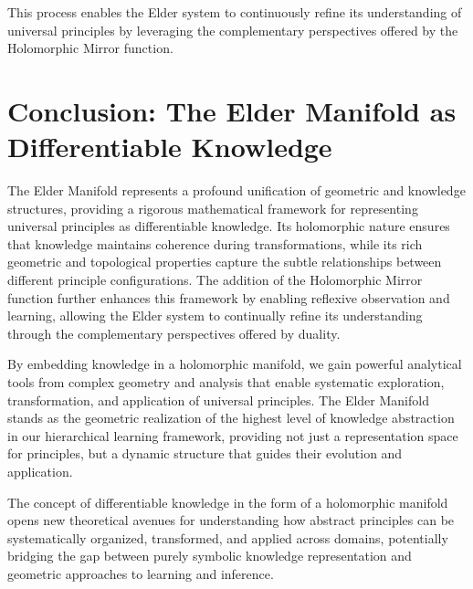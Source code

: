 This process enables the Elder system to continuously refine its understanding of universal principles by leveraging the complementary perspectives offered by the Holomorphic Mirror function.

\section{Conclusion: The Elder Manifold as Differentiable Knowledge}

The Elder Manifold represents a profound unification of geometric and knowledge structures, providing a rigorous mathematical framework for representing universal principles as differentiable knowledge. Its holomorphic nature ensures that knowledge maintains coherence during transformations, while its rich geometric and topological properties capture the subtle relationships between different principle configurations. The addition of the Holomorphic Mirror function further enhances this framework by enabling reflexive observation and learning, allowing the Elder system to continually refine its understanding through the complementary perspectives offered by duality.

By embedding knowledge in a holomorphic manifold, we gain powerful analytical tools from complex geometry and analysis that enable systematic exploration, transformation, and application of universal principles. The Elder Manifold stands as the geometric realization of the highest level of knowledge abstraction in our hierarchical learning framework, providing not just a representation space for principles, but a dynamic structure that guides their evolution and application.

The concept of differentiable knowledge in the form of a holomorphic manifold opens new theoretical avenues for understanding how abstract principles can be systematically organized, transformed, and applied across domains, potentially bridging the gap between purely symbolic knowledge representation and geometric approaches to learning and inference.